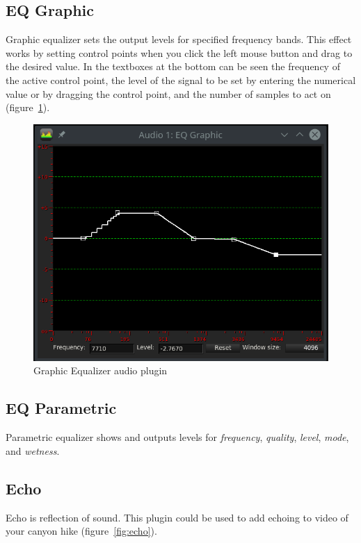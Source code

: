 \subsection{EQ Graphic}%
\label{sub:eq_graphic}

Graphic equalizer sets the output levels for specified frequency bands. This effect works by setting control points when you click the left mouse button and drag to the desired value. In the textboxes at the bottom can be seen the frequency of the active control point, the level of the signal to be set by entering the numerical value or by dragging the control point, and the number of samples to act on (figure~\ref{fig:equalizer}).

\begin{figure}[htpb]
    \centering
    \includegraphics[width=0.8\linewidth]{images/equalizer.png}
    \caption{Graphic Equalizer audio plugin}
    \label{fig:equalizer}
\end{figure}

\subsection{EQ Parametric}%
\label{sub:eq_parametric}

Parametric equalizer shows and outputs levels for \textit{frequency}, \textit{quality}, \textit{level}, \textit{mode}, and \textit{wetness}.

\subsection{Echo}%
\label{sub:echo}

Echo is reflection of sound. This plugin could be used to add echoing to video of your canyon hike (figure~\ref{fig:echo}).

